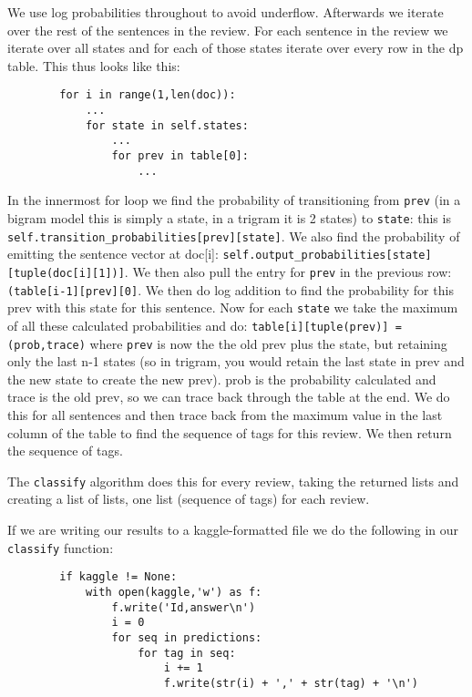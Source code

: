 \documentclass{article}
\begin{document}
We use log probabilities throughout to avoid underflow. Afterwards we iterate over the rest of the sentences in the review. For each sentence in the review we iterate over all states and for each of those states iterate over every row in the dp table. This thus looks like this:
\begin{verbatim}
        for i in range(1,len(doc)):
            ...
            for state in self.states:
                ...
                for prev in table[0]:
                    ...
\end{verbatim}

In the innermost for loop we find the probability of transitioning from \texttt{prev} (in a bigram model this is simply a state, in a trigram it is 2 states) to \texttt{state}: this is \texttt{self.transition\_probabilities[prev][state]}. We also find the probability of emitting the sentence vector at doc[i]: \texttt{self.output\_probabilities[state][tuple(doc[i][1])]}. We then also pull the entry for \texttt{prev} in the previous row: \texttt{(table[i-1][prev][0]}. We then do log addition to find the probability for this prev with this state for this sentence. Now for each \texttt{state} we take the maximum of all these calculated probabilities and do: \texttt{table[i][tuple(prev)] = (prob,trace)} where \texttt{prev} is now the the old prev plus the state, but retaining only the last n-1 states (so in trigram, you would retain the last state in prev and the new state to create the new prev). prob is the probability calculated and trace is the old prev, so we can trace back through the table at the end. We do this for all sentences and then trace back from the maximum value in the last column of the table to find the sequence of tags for this review. We then return the sequence of tags. 

The \texttt{classify} algorithm does this for every review, taking the returned lists and creating a list of lists, one list (sequence of tags) for each review. 

If we are writing our results to a kaggle-formatted file we do the following in our \texttt{classify} function: 
\begin{verbatim}
        if kaggle != None:
            with open(kaggle,'w') as f:
                f.write('Id,answer\n')
                i = 0
                for seq in predictions:
                    for tag in seq:
                        i += 1
                        f.write(str(i) + ',' + str(tag) + '\n')
\end{verbatim}
\end{document}

